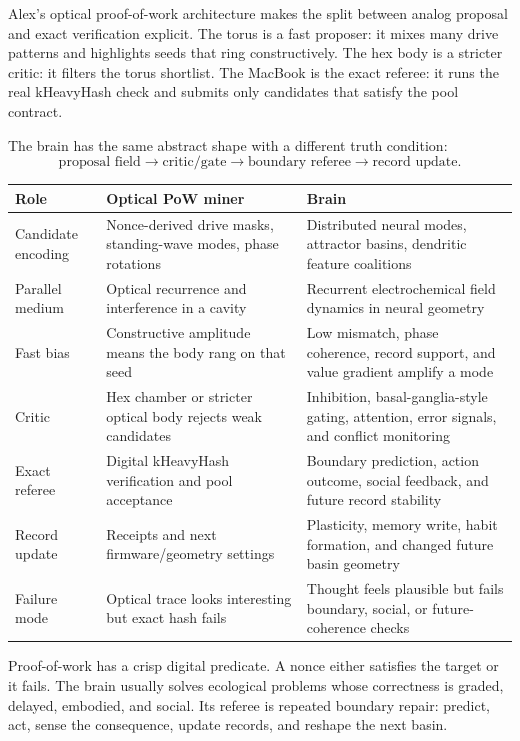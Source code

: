 \documentclass[11pt]{article}
\theoremstyle{remark}
\theoremstyle{plain}
\begin{document}
Alex's optical proof-of-work architecture makes the split between analog proposal and exact verification explicit. The torus is a fast proposer: it mixes many drive patterns and highlights seeds that ring constructively. The hex body is a stricter critic: it filters the torus shortlist. The MacBook is the exact referee: it runs the real kHeavyHash check and submits only candidates that satisfy the pool contract.

The brain has the same abstract shape with a different truth condition:
\[
\boxed{
\text{proposal field}
\to
\text{critic/gate}
\to
\text{boundary referee}
\to
\text{record update}.
}
\]

\begin{longtable}{L{0.24\textwidth}L{0.34\textwidth}L{0.34\textwidth}}
\toprule
\textbf{Role} & \textbf{Optical PoW miner} & \textbf{Brain} \\
\midrule
\endhead
Candidate encoding & Nonce-derived drive masks, standing-wave modes, phase rotations & Distributed neural modes, attractor basins, dendritic feature coalitions \\
Parallel medium & Optical recurrence and interference in a cavity & Recurrent electrochemical field dynamics in neural geometry \\
Fast bias & Constructive amplitude means the body rang on that seed & Low mismatch, phase coherence, record support, and value gradient amplify a mode \\
Critic & Hex chamber or stricter optical body rejects weak candidates & Inhibition, basal-ganglia-style gating, attention, error signals, and conflict monitoring \\
Exact referee & Digital kHeavyHash verification and pool acceptance & Boundary prediction, action outcome, social feedback, and future record stability \\
Record update & Receipts and next firmware/geometry settings & Plasticity, memory write, habit formation, and changed future basin geometry \\
Failure mode & Optical trace looks interesting but exact hash fails & Thought feels plausible but fails boundary, social, or future-coherence checks \\
\bottomrule
\end{longtable}

Proof-of-work has a crisp digital predicate. A nonce either satisfies the target or it fails. The brain usually solves ecological problems whose correctness is graded, delayed, embodied, and social. Its referee is repeated boundary repair: predict, act, sense the consequence, update records, and reshape the next basin.
\end{document}

